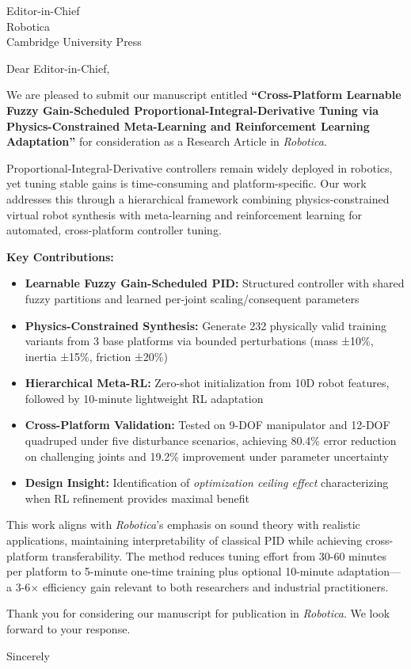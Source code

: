 \documentclass[11pt]{letter}
\begin{document}
\begin{letter}{%
Editor-in-Chief\\
Robotica\\
Cambridge University Press}

\opening{Dear Editor-in-Chief,}

We are pleased to submit our manuscript entitled \textbf{``Cross-Platform Learnable Fuzzy Gain-Scheduled Proportional-Integral-Derivative Tuning via Physics-Constrained Meta-Learning and Reinforcement Learning Adaptation''} for consideration as a Research Article in \textit{Robotica}.

Proportional-Integral-Derivative controllers remain widely deployed in robotics, yet tuning stable gains is time-consuming and platform-specific. Our work addresses this through a hierarchical framework combining physics-constrained virtual robot synthesis with meta-learning and reinforcement learning for automated, cross-platform controller tuning.

\textbf{Key Contributions:}

\begin{itemize}
\item \textbf{Learnable Fuzzy Gain-Scheduled PID:} Structured controller with shared fuzzy partitions and learned per-joint scaling/consequent parameters
\item \textbf{Physics-Constrained Synthesis:} Generate 232 physically valid training variants from 3 base platforms via bounded perturbations (mass ±10\%, inertia ±15\%, friction ±20\%)
\item \textbf{Hierarchical Meta-RL:} Zero-shot initialization from 10D robot features, followed by 10-minute lightweight RL adaptation
\item \textbf{Cross-Platform Validation:} Tested on 9-DOF manipulator and 12-DOF quadruped under five disturbance scenarios, achieving 80.4\% error reduction on challenging joints and 19.2\% improvement under parameter uncertainty
\item \textbf{Design Insight:} Identification of \textit{optimization ceiling effect} characterizing when RL refinement provides maximal benefit
\end{itemize}

This work aligns with \textit{Robotica}'s emphasis on sound theory with realistic applications, maintaining interpretability of classical PID while achieving cross-platform transferability. The method reduces tuning effort from 30-60 minutes per platform to 5-minute one-time training plus optional 10-minute adaptation—a 3-6× efficiency gain relevant to both researchers and industrial practitioners.

Thank you for considering our manuscript for publication in \textit{Robotica}. We look forward to your response.

Sincerely

\end{letter}
\end{document}
